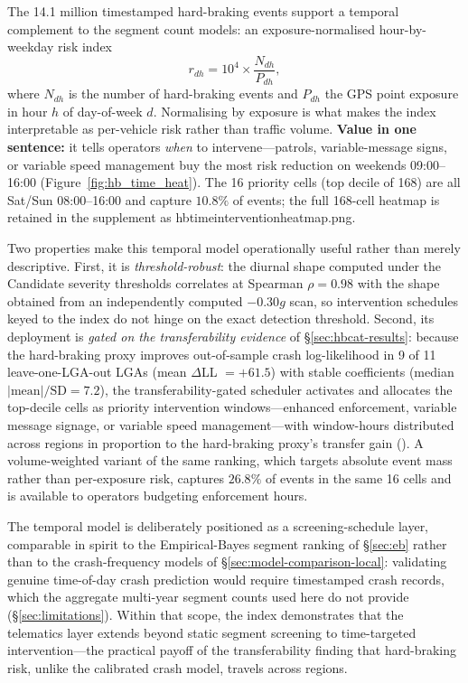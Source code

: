 \documentclass[letterpaper,8pt]{extarticle}  %
\newcommand{\file}[1]{{\ttfamily\def\_{\textunderscore\allowbreak}#1}}
\begin{document}
\begin{doublespacing}
\begin{linenumbers}
The 14.1 million timestamped hard-braking events support a temporal complement to the segment count models: an exposure-normalised hour-by-weekday risk index
\begin{equation}
  r_{dh} = 10^4 \times \frac{N_{dh}}{P_{dh}},
\end{equation}
where $N_{dh}$ is the number of hard-braking events and $P_{dh}$ the GPS point exposure in hour $h$ of day-of-week $d$. Normalising by exposure is what makes the index interpretable as per-vehicle risk rather than traffic volume. \textbf{Value in one sentence:} it tells operators \emph{when} to intervene---patrols, variable-message signs, or variable speed management buy the most risk reduction on weekends 09:00--16:00 (Figure~\ref{fig:hb_time_heat}). The 16 priority cells (top decile of 168) are all Sat/Sun 08:00--16:00 and capture $10.8\%$ of events; the full 168-cell heatmap is retained in the supplement as \file{hb\_time\_intervention\_heatmap.png}.



\FloatBarrier

Two properties make this temporal model operationally useful rather than merely descriptive. First, it is \emph{threshold-robust}: the diurnal shape computed under the Candidate severity thresholds correlates at Spearman $\rho=0.98$ with the shape obtained from an independently computed $-0.30g$ scan, so intervention schedules keyed to the index do not hinge on the exact detection threshold. Second, its deployment is \emph{gated on the transferability evidence} of \S\ref{sec:hbcat-results}: because the hard-braking proxy improves out-of-sample crash log-likelihood in 9 of 11 leave-one-LGA-out LGAs (mean $\Delta$LL $=+61.5$) with stable coefficients (median $|\text{mean}|/\text{SD} = 7.2$), the transferability-gated scheduler activates and allocates the top-decile cells as priority intervention windows---enhanced enforcement, variable message signage, or variable speed management---with window-hours distributed across regions in proportion to the hard-braking proxy's transfer gain (). A volume-weighted variant of the same ranking, which targets absolute event mass rather than per-exposure risk, captures $26.8\%$ of events in the same 16 cells and is available to operators budgeting enforcement hours.

The temporal model is deliberately positioned as a screening-schedule layer, comparable in spirit to the Empirical-Bayes segment ranking of \S\ref{sec:eb} rather than to the crash-frequency models of \S\ref{sec:model-comparison-local}: validating genuine time-of-day crash prediction would require timestamped crash records, which the aggregate multi-year segment counts used here do not provide (\S\ref{sec:limitations}). Within that scope, the index demonstrates that the telematics layer extends beyond static segment screening to time-targeted intervention---the practical payoff of the transferability finding that hard-braking risk, unlike the calibrated crash model, travels across regions.


\end{linenumbers}
\end{doublespacing}
\end{document}
